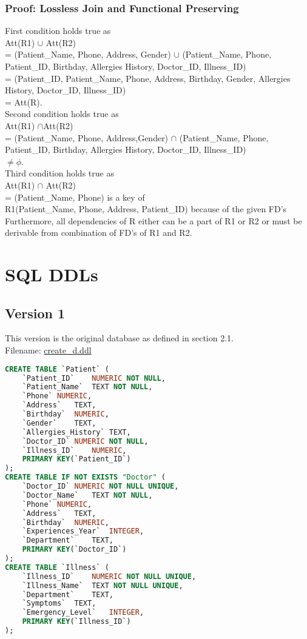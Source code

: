 \documentclass[12pt,arial]{article}
\begin{document}
\subsubsection{Proof: Lossless Join and Functional Preserving}
First condition holds true as \\Att(R1) $\cup$ Att(R2) \\= (Patient\_Name, Phone, Address, Gender) $\cup$ (Patient\_Name, Phone, Patient\_ID, Birthday, Allergies History, Doctor\_ID, Illness\_ID) \\= (Patient\_ID, Patient\_Name, Phone, Address, Birthday, Gender, Allergies History, Doctor\_ID, Illness\_ID)\\= Att(R).\\ \hfil \break
Second condition holds true as \\Att(R1) $\cap$Att(R2) \\= (Patient\_Name, Phone, Address,Gender) $\cap$ (Patient\_Name, Phone, Patient\_ID, Birthday, Allergies History, Doctor\_ID, Illness\_ID) \\$\neq \phi$.\\ \hfil \break
Third condition holds true as \\Att(R1) $\cap$ Att(R2) \\= (Patient\_Name, Phone) is a key of \\R1(Patient\_Name, Phone, Address, Patient\_ID) because of the given FD's\\ \hfil \break
Furthermore, all dependencies of R either can be a part of R1 or R2 or must be derivable from combination of FD’s of R1 and R2.
\section{SQL DDLs}
\subsection{Version 1}
This version is the original database as defined in section 2.1.\\
Filename: \url{create_d.ddl}
\begin{lstlisting}[language=SQL]
	CREATE TABLE `Patient` (
	`Patient_ID`	NUMERIC NOT NULL,
	`Patient_Name`	TEXT NOT NULL,
	`Phone`	NUMERIC,
	`Address`	TEXT,
	`Birthday`	NUMERIC,
	`Gender`	TEXT,
	`Allergies_History`	TEXT,
	`Doctor_ID`	NUMERIC NOT NULL,
	`Illness_ID`	NUMERIC,
	PRIMARY KEY(`Patient_ID`)
);
CREATE TABLE IF NOT EXISTS "Doctor" (
	`Doctor_ID`	NUMERIC NOT NULL UNIQUE,
	`Doctor_Name`	TEXT NOT NULL,
	`Phone`	NUMERIC,
	`Address`	TEXT,
	`Birthday`	NUMERIC,
	`Experiences_Year`	INTEGER,
	`Department`	TEXT,
	PRIMARY KEY(`Doctor_ID`)
);
CREATE TABLE `Illness` (
	`Illness_ID`	NUMERIC NOT NULL UNIQUE,
	`Illness_Name`	TEXT NOT NULL UNIQUE,
	`Department`	TEXT,
	`Symptoms`	TEXT,
	`Emergency_Level`	INTEGER,
	PRIMARY KEY(`Illness_ID`)
);
\end{lstlisting}
\end{document}
